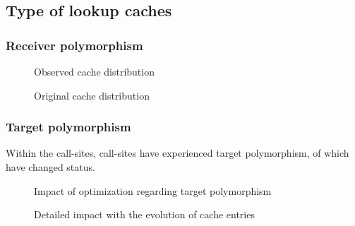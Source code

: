 \documentclass[preprint]{acmart}
\begin{document}
\subsection{Type of lookup caches}

\subsubsection{Receiver polymorphism}

\begin{figure}[h]
  \centering
  \CacheDistribObservedSplitting
  \caption{
    Observed cache distribution}
\end{figure}


\begin{figure}[h]
  \centering
  \CacheDistribOriginalSplitting
  \caption{
    Original cache distribution}
\end{figure}


\subsubsection{Target polymorphism}

Within the \NumberCallSitesSplitting call-sites, \HasExperiencedTP call-sites have experienced target polymorphism, of which \HasChangedStatus have changed status.

\begin{figure}[h]
  \centering
  \TargetPolymorphism
  \caption{
    Impact of optimization regarding target polymorphism}
\end{figure}

\begin{figure}[h]
  \centering
  \TargetPolymorphismDetails
  \caption{
    Detailed impact with the evolution of cache entries}
\end{figure}


%
%
\end{document}
